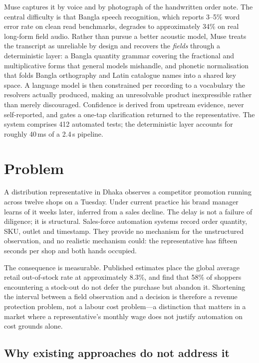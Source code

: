 \documentclass[11pt,a4paper]{article}
\begin{document}
Muse captures it by voice and by photograph of the handwritten order note. The
central difficulty is that Bangla speech recognition, which reports 3--5\% word
error rate on clean read benchmarks, degrades to approximately 34\% on real
long-form field audio. Rather than pursue a better acoustic model, Muse treats
the transcript as unreliable by design and recovers the \emph{fields} through a
deterministic layer: a Bangla quantity grammar covering the fractional and
multiplicative forms that general models mishandle, and phonetic normalisation
that folds Bangla orthography and Latin catalogue names into a shared key
space. A language model is then constrained per recording to a vocabulary the
resolvers actually produced, making an unresolvable product inexpressible
rather than merely discouraged. Confidence is derived from upstream evidence,
never self-reported, and gates a one-tap clarification returned to the
representative. The system comprises 412 automated tests; the deterministic
layer accounts for roughly 40\,ms of a 2.4\,s pipeline.

\section{Problem}

A distribution representative in Dhaka observes a competitor promotion running
across twelve shops on a Tuesday. Under current practice his brand manager
learns of it weeks later, inferred from a sales decline. The delay is not a
failure of diligence; it is structural. Sales-force automation systems record
order quantity, SKU, outlet and timestamp. They provide no mechanism for the
unstructured observation, and no realistic mechanism could: the representative
has fifteen seconds per shop and both hands occupied.

The consequence is measurable. Published estimates place the global average
retail out-of-stock rate at approximately 8.3\%, and find that 58\% of shoppers
encountering a stock-out do not defer the purchase but abandon it. Shortening
the interval between a field observation and a decision is therefore a revenue
protection problem, not a labour cost problem---a distinction that matters in a
market where a representative's monthly wage does not justify automation on
cost grounds alone.

\subsection{Why existing approaches do not address it}
\end{document}
